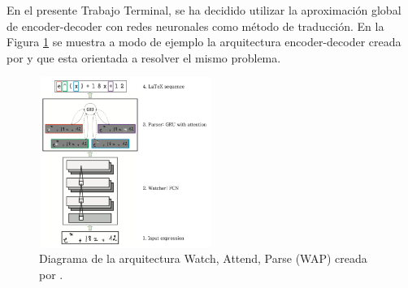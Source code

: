 En el presente Trabajo Terminal, se ha decidido utilizar la aproximación global de encoder-decoder con redes neuronales como método de traducción. En la Figura \ref{fig:wap} se muestra a modo de ejemplo la arquitectura encoder-decoder creada por \cite{chino} y que esta orientada a resolver el mismo problema.

\begin{figure}[H]
	\centering
	\includegraphics[width=0.5\textwidth]{capitulo3/imgs/wap}
	\caption{Diagrama de la arquitectura Watch, Attend, Parse (WAP) creada por \cite{chino}.}
	\label{fig:wap}
\end{figure}


